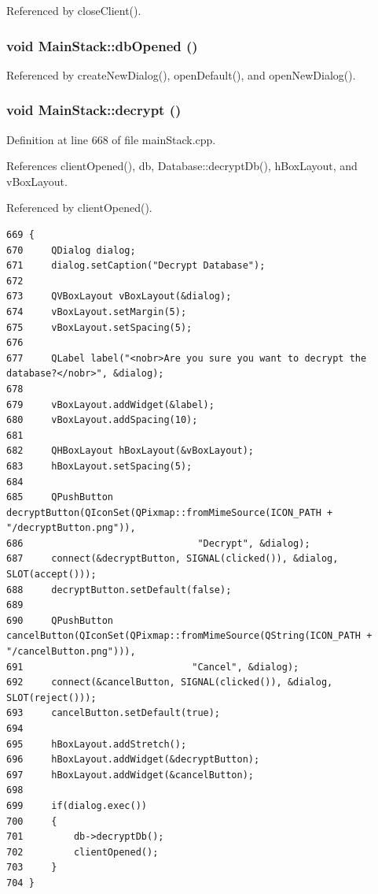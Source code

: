 Referenced by close\-Client().\hypertarget{classMainStack_l3}{
\subsubsection[dbOpened]{\setlength{\rightskip}{0pt plus 5cm}void Main\-Stack::db\-Opened ()}}
\label{classMainStack_l3}




Referenced by create\-New\-Dialog(), open\-Default(), and open\-New\-Dialog().\hypertarget{classMainStack_k8}{
\subsubsection[decrypt]{\setlength{\rightskip}{0pt plus 5cm}void Main\-Stack::decrypt ()}}
\label{classMainStack_k8}


Definition at line 668 of file main\-Stack.cpp.

References client\-Opened(), db, Database::decrypt\-Db(), h\-Box\-Layout, and v\-Box\-Layout.

Referenced by client\-Opened().

\footnotesize\begin{verbatim}669 {
670     QDialog dialog;
671     dialog.setCaption("Decrypt Database");
672 
673     QVBoxLayout vBoxLayout(&dialog);
674     vBoxLayout.setMargin(5);
675     vBoxLayout.setSpacing(5);
676 
677     QLabel label("<nobr>Are you sure you want to decrypt the database?</nobr>", &dialog);
678 
679     vBoxLayout.addWidget(&label);
680     vBoxLayout.addSpacing(10);
681 
682     QHBoxLayout hBoxLayout(&vBoxLayout);
683     hBoxLayout.setSpacing(5);
684 
685     QPushButton decryptButton(QIconSet(QPixmap::fromMimeSource(ICON_PATH + "/decryptButton.png")),
686                               "Decrypt", &dialog);
687     connect(&decryptButton, SIGNAL(clicked()), &dialog, SLOT(accept()));
688     decryptButton.setDefault(false);
689 
690     QPushButton cancelButton(QIconSet(QPixmap::fromMimeSource(QString(ICON_PATH + "/cancelButton.png"))),
691                              "Cancel", &dialog);
692     connect(&cancelButton, SIGNAL(clicked()), &dialog, SLOT(reject()));
693     cancelButton.setDefault(true);
694 
695     hBoxLayout.addStretch();
696     hBoxLayout.addWidget(&decryptButton);
697     hBoxLayout.addWidget(&cancelButton);
698 
699     if(dialog.exec())
700     {
701         db->decryptDb();
702         clientOpened();
703     }
704 }
\end{verbatim}\normalsize 



